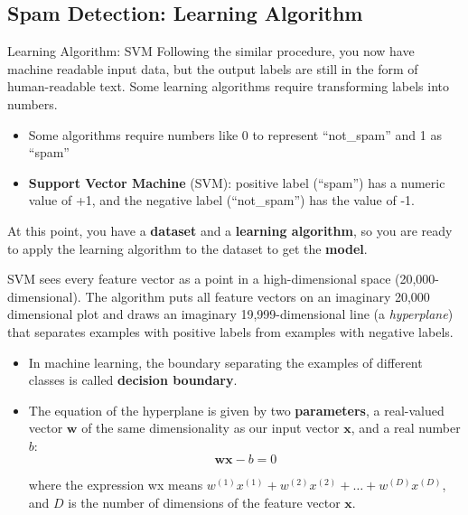 \documentclass[10pt,dvipsnames]{beamer}
\begin{document}
\subsection{Spam Detection: Learning Algorithm}
\begin{frame}{Learning Algorithm: SVM}
    Following the similar procedure, you now have machine readable input data, but the output labels are still in the form of human-readable text. Some learning algorithms require transforming labels into numbers.
    \begin{itemize}
        \item Some algorithms require numbers like 0 to represent ``not\_spam'' and 1 as ``spam''
        \item \textbf{Support Vector Machine} (SVM): positive label (``spam'') has a numeric value of +1, and the negative label (``not\_spam'') has the value of -1.
    \end{itemize}
    At this point, you have a \textbf{dataset} and a \textbf{learning algorithm}, so you are ready to apply the learning algorithm to the dataset to get the \textbf{model}.
\end{frame}

\begin{frame}
    SVM sees every feature vector as a point in a high-dimensional space (20,000-dimensional). The algorithm puts all feature vectors on an imaginary 20,000 dimensional plot and draws an imaginary 19,999-dimensional line (a \textit{hyperplane}) that separates examples with positive labels from examples with negative labels.
    \begin{itemize}
        \item In machine learning, the boundary separating the examples of different classes is called \textbf{decision boundary}.
        \item The equation of the hyperplane is given by two \textbf{parameters}, a real-valued vector \(\mathbf{w}\) of the same dimensionality as our input vector \(\mathbf{x}\), and a real number \(b\):
              \begin{equation}
                  \mathbf{w} \mathbf{x}-b=0
              \end{equation}

              where the expression wx means \(w^{(1)} x^{(1)}+w^{(2)} x^{(2)}+\ldots+w^{(D)} x^{(D)}\), and \(D\) is the number of dimensions of the feature vector \(\mathbf{x}\).
    \end{itemize}
\end{frame}
\end{document}
